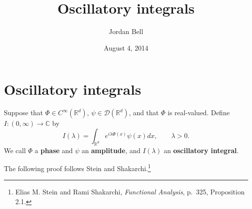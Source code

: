 \documentclass{article}
\theoremstyle{definition}
\begin{document}
\title{Oscillatory integrals}
\author{Jordan Bell}
\date{August 4, 2014}

\maketitle

\section{Oscillatory integrals}
Suppose that $\Phi \in C^\infty(\mathbb{R}^d)$, $\psi \in \mathscr{D}(\mathbb{R}^d)$, and that $\Phi$ is real-valued. Define
$I:(0,\infty) \to \mathbb{C}$ 
by
\[
I(\lambda) = \int_{\mathbb{R}^d} e^{i\lambda \Phi(x)} \psi(x) dx, \qquad \lambda>0.
\]
We call $\Phi$ a \textbf{phase} and $\psi$ an \textbf{amplitude}, and $I(\lambda)$ an \textbf{oscillatory integral}.

The following proof follows Stein and Shakarchi.\footnote{Elias
M. Stein and Rami Shakarchi, {\em Functional Analysis}, p.~325, Proposition 2.1.}
\end{document}
